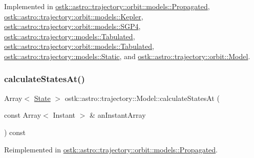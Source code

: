 Implemented in \hyperlink{classostk_1_1astro_1_1trajectory_1_1orbit_1_1models_1_1_propagated_a2efc3c1af735dcf2ec622d056fa0a13f}{ostk\+::astro\+::trajectory\+::orbit\+::models\+::\+Propagated}, \hyperlink{classostk_1_1astro_1_1trajectory_1_1orbit_1_1models_1_1_kepler_a4de0c3d7a2b37c1c2ab4d6e207339809}{ostk\+::astro\+::trajectory\+::orbit\+::models\+::\+Kepler}, \hyperlink{classostk_1_1astro_1_1trajectory_1_1orbit_1_1models_1_1_s_g_p4_ad88439d9c46a75d3da8c20d2872271e3}{ostk\+::astro\+::trajectory\+::orbit\+::models\+::\+S\+G\+P4}, \hyperlink{classostk_1_1astro_1_1trajectory_1_1models_1_1_tabulated_af2ebaa6456986636aa58c2f8666ed0b9}{ostk\+::astro\+::trajectory\+::models\+::\+Tabulated}, \hyperlink{classostk_1_1astro_1_1trajectory_1_1orbit_1_1models_1_1_tabulated_ad7935cafe71b572b97b9df93e469d2f8}{ostk\+::astro\+::trajectory\+::orbit\+::models\+::\+Tabulated}, \hyperlink{classostk_1_1astro_1_1trajectory_1_1models_1_1_static_a4297a74c953a105dc887a31227fbe1ff}{ostk\+::astro\+::trajectory\+::models\+::\+Static}, and \hyperlink{classostk_1_1astro_1_1trajectory_1_1orbit_1_1_model_a34a0d8979ec1f7ade3e434fc0dad3711}{ostk\+::astro\+::trajectory\+::orbit\+::\+Model}.

\mbox{\label{classostk_1_1astro_1_1trajectory_1_1_model_a3c3e4913aed2272174c0e6cd0d1a6415}} 
\subsubsection{\texorpdfstring{calculate\+States\+At()}{calculateStatesAt()}}
{\footnotesize\ttfamily Array$<$ \hyperlink{classostk_1_1astro_1_1trajectory_1_1_state}{State} $>$ ostk\+::astro\+::trajectory\+::\+Model\+::calculate\+States\+At (\begin{DoxyParamCaption}\item[{const Array$<$ Instant $>$ \&}]{an\+Instant\+Array }\end{DoxyParamCaption}) const\hspace{0.3cm}{\ttfamily [virtual]}}



Reimplemented in \hyperlink{classostk_1_1astro_1_1trajectory_1_1orbit_1_1models_1_1_propagated_a9a4097432d2c863aedead23d2d67a7a7}{ostk\+::astro\+::trajectory\+::orbit\+::models\+::\+Propagated}.

